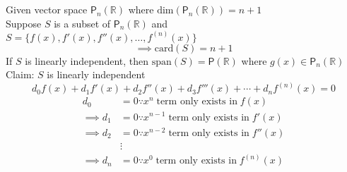 \\\hfill\\
Given vector space $\mathsf{P}_n(\mathbb{R})$ where
$\text{dim}(\mathsf{P}_n(\mathbb{R}))=n +1$\\
Suppose $S$ is a subset of $\mathsf{P}_n(\mathbb{R})$ and $S
=\{f(x),f'(x),f''(x),\dots,f^{(n)}(x)\}$
\begin{equation}
\implies \text{card}(S) = n+1
\end{equation}
If $S$ is linearly independent, then $\text{span}(S) =
\mathsf{P}(\mathbb{R})$ where $g(x) \in \mathsf{P}_n(\mathbb{R})$
\\Claim: $S$ is linearly independent
\begin{equation}
d_0f(x) +d_1f'(x) +d_2f''(x) +d_3f'''(x) + \cdots +d_nf^{(n)}(x) =0
\end{equation}
\begin{align}
d_0 &= 0 \because x^n\;\text{term only exists in}\; f(x)\\
\implies d_1 &= 0 \because x^{n-1}\;\text{term only exists in}\; f'(x)\\
\implies d_2 &= 0 \because x^{n-2}\;\text{term only exists in}\; f''(x)\\
&\vdots\\
\implies d_n &= 0 \because x^0\;\text{term only exists in}\; f^{(n)}(x)
\end{align}
